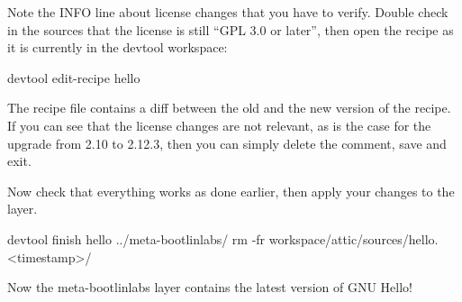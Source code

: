 Note the INFO line about license changes that you have to verify. Double
check in the sources that the license is still ``GPL 3.0 or later'', then
open the recipe as it is currently in the devtool workspace:
\begin{bashinput}
devtool edit-recipe hello
\end{bashinput}

The recipe file contains a diff between the old and the new version of the
recipe. If you can see that the license changes are not relevant, as is the
case for the upgrade from 2.10 to 2.12.3, then you can simply delete the
comment, save and exit.

Now check that everything works as done earlier, then apply your changes to the layer.
\begin{bashinput}
devtool finish hello ../meta-bootlinlabs/
rm -fr workspace/attic/sources/hello.<timestamp>/
\end{bashinput}

Now the meta-bootlinlabs layer contains the latest version of GNU Hello!
